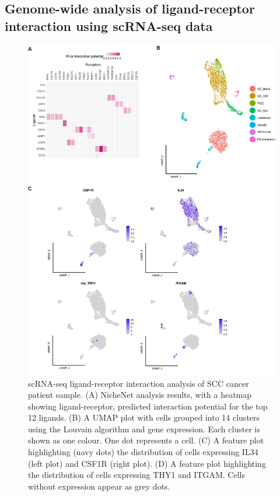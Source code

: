 \subsection{Genome-wide analysis of ligand-receptor interaction using scRNA-seq data}
\begin{figure}[htp]
\renewcommand{\figurename}{Figure}
    \centering
    \includegraphics[width=0.75\columnwidth]{Chapter2/Figures/Supplemental_Fig_S2.png}
    \caption[scRNA-seq ligand-receptor interaction analysis of SCC cancer patient sample. ]{scRNA-seq ligand-receptor interaction analysis of SCC cancer patient sample. (A) NicheNet analysis results, with a heatmap showing ligand-receptor, predicted interaction potential for the top 12 ligands. (B) A UMAP plot with cells grouped into 14 clusters using the Louvain algorithm and gene expression. Each cluster is shown as one colour. One dot represents a cell. (C) A feature plot highlighting (navy dots) the distribution of cells expressing IL34 (left plot) and CSF1R (right plot). (D) A feature plot highlighting the distribution of cells expressing THY1 and ITGAM. Cells without expression appear as grey dots.}
    \label{fig:Chap2_Supfigure2}
\end{figure}


